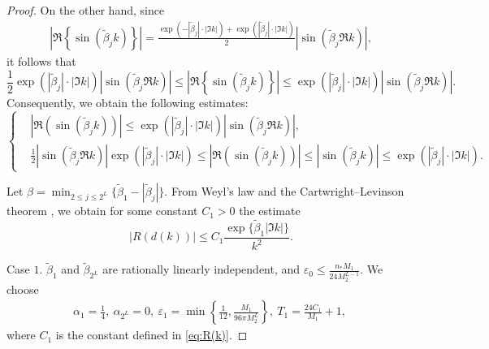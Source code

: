 \documentclass[11pt,reqno]{amsart}
\theoremstyle{definition}
\theoremstyle{remark}
\numberwithin{equation}{section}
\begin{document}
\begin{proof}
On the other hand, since
\begin{equation*}
	\begin{aligned}
		\left|\Re\left\{\sin\left(\tilde{\beta}_j k\right)\right\}\right|=\frac{\exp\left(-|\tilde{\beta}_j|\cdot|\Im k|\right)+\exp\left(|\tilde{\beta}_j|\cdot|\Im k|\right) }{2}\left|\sin\left(\tilde{\beta}_j\Re k\right)\right|,
	\end{aligned}
\end{equation*}
it follows that
\begin{equation}\label{eq:bounds for real part of sin tilde beta_j k}
   \frac{1}{2}\exp\left(|\tilde{\beta}_j|\cdot|\Im k|\right) \left|\sin\left(\tilde{\beta}_j\Re k\right)\right| \leq \left|\Re\left\{\sin\left(\tilde{\beta}_j k\right)\right\}\right|\leq \exp\left(|\tilde{\beta}_j|\cdot|\Im k|\right) \left|\sin\left(\tilde{\beta}_j\Re k\right)\right|.
\end{equation}
Consequently, we obtain the following estimates:
\begin{equation}\label{eq:upper and lower estimation for sin}
  \left\{
  \begin{aligned}
   &\left|\Re \left(\sin\left(\tilde{\beta}_jk\right)\right)\right|\leq \exp{\left(\left|\tilde{\beta}_j\right|\cdot\left|\Im k\right|\right)}\left|\sin\left(\tilde{\beta}_j\Re k\right)\right|,~\\
   &\frac{1}{2}\left| \sin\left(\tilde{\beta}_j \Re k\right) \right|\exp{\left(|\tilde{\beta}_j| \cdot |\Im k|\right)}\leq \left| \Re\left(\sin\left(\tilde{\beta}_jk\right)\right) \right|\leq \left|\sin\left(\tilde{\beta}_jk\right)\right|\leq \exp{\left(\left|\tilde{\beta}_j\right|\cdot \left|\Im k\right|\right)}.~
  \end{aligned}
  \right.
\end{equation}

Let $\beta = \min_{2 \leq j \leq 2^L} \bigl\{ \tilde{\beta}_1 - |\tilde{\beta}_j| \bigr\}$. 
From Weyl's law and the Cartwright--Levinson theorem \cite{CCH16,LV15}, we obtain for some 
constant $C_1 > 0$ the estimate
\begin{equation}\label{eq:R(k)}
	|R(d(k))| \leq C_1 \frac{\exp\{\tilde{\beta}_1|\Im k|\}}{k^2}.
\end{equation}


Case $1$. $\tilde{\beta}_1$ and $\tilde{\beta}_{2^L}$ are rationally linearly independent, and $\varepsilon_0\leq \frac{n_{*}M_1}{24M_2^{L-1}}$. We choose  
\begin{equation}\label{eq:Kronecker theorem linear independence set up}
  \begin{aligned}
   \alpha_1=\frac{1}{4},~ \alpha_{2^L}=0,~ \varepsilon_1=\min\left\{\frac{1}{12}, \frac{M_1}{96\pi M_2^L}\right\},~T_1=\frac{24C_1}{M_1}+1,~
  \end{aligned}
\end{equation}
where $C_1$ is the constant defined in \eqref{eq:R(k)}.


\end{proof}
\end{document}
